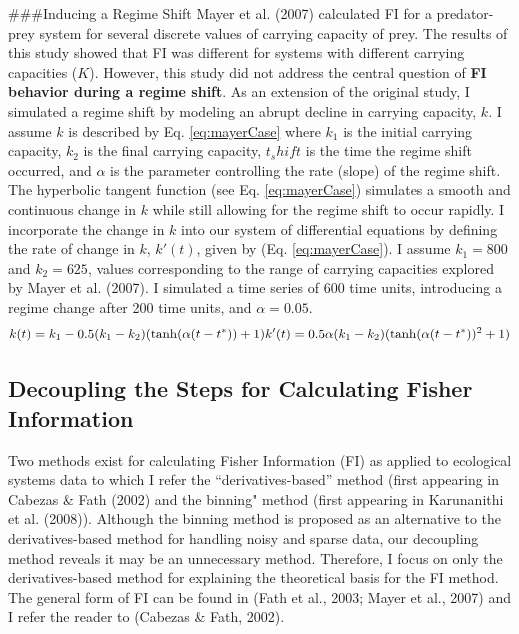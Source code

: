\documentclass[12pt,twoside,openany]{reedthesis}
\begin{document}
\#\#\#Inducing a Regime Shift
Mayer et al. (2007) calculated FI for a predator-prey system for several discrete values of carrying capacity of prey. The results of this study showed that FI was different for systems with different carrying capacities (\(K\)). However, this study did not address the central question of \textbf{FI behavior during a regime shift}. As an extension of the original study, I simulated a regime shift by modeling an abrupt decline in carrying capacity, \(k\). I assume \(k\) is described by Eq. \eqref{eq:mayerCase} where \(k_1\) is the initial carrying capacity, \(k_2\) is the final carrying capacity, \(t_shift\) is the time the regime shift occurred, and \(\alpha\) is the parameter controlling the rate (slope) of the regime shift. The hyperbolic tangent function (see Eq. \eqref{eq:mayerCase}) simulates a smooth and continuous change in \(k\) while still allowing for the regime shift to occur rapidly. I incorporate the change in \(k\) into our system of differential equations by defining the rate of change in \(k\), \(k'(t)\), given by (Eq. \eqref{eq:mayerCase}). I assume \(k_1=800\) and \(k_2=625\), values corresponding to the range of carrying capacities explored by Mayer et al. (2007). I simulated a time series of 600 time units, introducing a regime change after 200 time units, and \(\alpha=0.05\).
\begin{equation}  
  k(t) = k_1  - 0.5(k_1-k_2)(\tanh(\alpha (t-t^*))+1)     \\
  k'(t) = 0.5\alpha (k_1-k_2)(\tanh(\alpha(t-t^*))^2 +1)      \\ 
\label{eq:mayerCase}
\end{equation}
\hypertarget{decoupling-the-steps-for-calculating-fisher-information}{%
\subsection{Decoupling the Steps for Calculating Fisher Information}\label{decoupling-the-steps-for-calculating-fisher-information}}

Two methods exist for calculating Fisher Information (FI) as applied to ecological systems data to which I refer the ``derivatives-based'' method (first appearing in Cabezas \& Fath (2002) and the binning" method (first appearing in Karunanithi et al. (2008)). Although the binning method is proposed as an alternative to the derivatives-based method for handling noisy and sparse data, our decoupling method reveals it may be an unnecessary method. Therefore, I focus on only the derivatives-based method for explaining the theoretical basis for the FI method. The general form of FI can be found in (Fath et al., 2003; Mayer et al., 2007) and I refer the reader to (Cabezas \& Fath, 2002).
\end{document}
